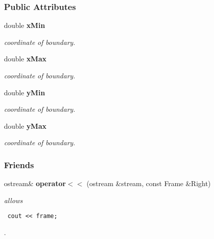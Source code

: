 \subsubsection*{Public Attributes}
\begin{CompactItemize}
\item 
{}
double {\bf x\-Min}\label{class_frame_m0}

\begin{CompactList}\small\item\em coordinate of boundary.\item\end{CompactList}\item 
{}
double {\bf x\-Max}\label{class_frame_m1}

\begin{CompactList}\small\item\em coordinate of boundary.\item\end{CompactList}\item 
{}
double {\bf y\-Min}\label{class_frame_m2}

\begin{CompactList}\small\item\em coordinate of boundary.\item\end{CompactList}\item 
{}
double {\bf y\-Max}\label{class_frame_m3}

\begin{CompactList}\small\item\em coordinate of boundary.\item\end{CompactList}\end{CompactItemize}
\subsubsection*{Friends}
\begin{CompactItemize}
\item 
{}
ostream\& {\bf operator$<$$<$} (ostream \&stream, const Frame \&Right)\label{class_frame_l0}

\begin{CompactList}\small\item\em allows \footnotesize\begin{verbatim} cout << frame; \end{verbatim}\normalsize 
.\item\end{CompactList}\end{CompactItemize}


